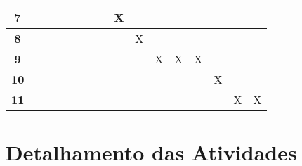 \begin{table}[htb!]
\begin{tabular}{c|c|c|c|c|c|c|c|c|c|c|c|c|c|c|c|}
\multicolumn{1}{|c|}{{\bf 7}}         &         &         &               &         &         &         &         & X       &         &          &         &         &         &         &         \\ \hline
\multicolumn{1}{|c|}{{\bf 8}}         &         &         &               &         &         &         &         &         & X       &          &         &         &         &         &         \\ \hline
\multicolumn{1}{|c|}{{\bf 9}}         &         &         &               &         &         &         &         &         &         & X        & X       & X       &         &         &         \\ \hline
\multicolumn{1}{|c|}{{\bf 10}}        &         &         &               &         &         &         &         &         &         &          &         &         & X       &         &         \\ \hline
\multicolumn{1}{|c|}{{\bf 11}}        &         &         &               &         &         &         &         &         &         &          &         &         &         & X       & X       \\ \hline
\end{tabular}
\end{table}

\section{Detalhamento das Atividades}

